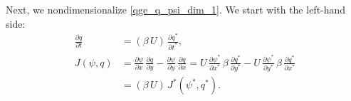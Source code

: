 Next, we nondimensionalize \eqref{qge_q_psi_dim_1}. We start with the left-hand side:
\begin{align}
  \frac{\partial q}{\partial t} &= ( \beta \, U) \, \frac{\partial q^*}{\partial t^*} ,
    \label{eqn:qge_q_psi_nondim_5} \\[0.2cm]
  J(\psi,q) &=  \frac{\partial \psi}{\partial x} \, \frac{\partial q}{\partial y} - \frac{\partial
    \psi}{\partial y} \, \frac{\partial q}{\partial x}
    = U \, \frac{\partial \psi^*}{\partial x^*} \, \beta \, \frac{\partial q^*}{\partial y^*} - U \,
      \frac{\partial \psi^*}{\partial y^*} \,  \beta \, \frac{\partial q^*}{\partial x^*}
      \nonumber \\[0.2cm]
  &= (  \beta \, U ) \, J^*(\psi^*,q^*) .
  \label{eqn:qge_q_psi_nondim_6}
\end{align}

